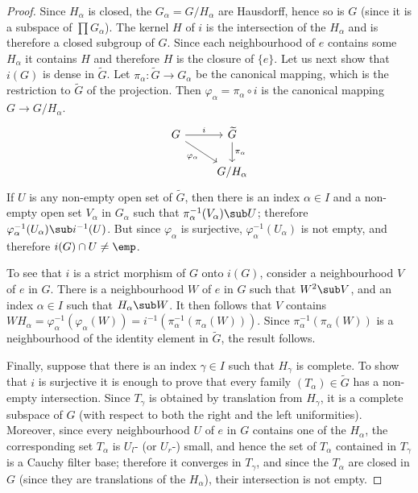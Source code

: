 \begin{proof}
Since $H_\alpha$ is closed, the $G_\alpha=G/H_\alpha$ are Hausdorff, hence so is $G$ (since it is a subspace of $\prod G_\alpha$). The kernel $H$ of $i$ is the intersection of the $H_\alpha$ and is therefore a closed subgroup of $G$. Since each neighbourhood of $e$ contains some $H_\alpha$ it contains $H$ and therefore $H$ is the closure of $\{e\}$. Let us next show that $i(G)$ is dense in $\widetilde{G}$. Let $\pi_\alpha:\widetilde{G}\to G_\alpha$ be the canonical mapping, which is the restriction to $\widetilde{G}$ of the projection. Then $\varphi_\alpha=\pi_\alpha\circ i$ is the canonical mapping $G\to G/H_\alpha$. 
\[\begin{tikzcd}
G\ar[r,"i"]\ar[rd,swap,"\varphi_\alpha"]&\widetilde{G}\ar[d,"\pi_\alpha"]\\
&G/H_\alpha
\end{tikzcd}\]
If $U$ is any non-empty open set of $\widetilde{G}$, then there is an index $\alpha\in I$ and a non-empty open set $V_\alpha$ in $G_\alpha$ such that $\pi_\alpha^{-1}(V_\alpha)\sub U$; therefore $\varphi_\alpha^{-1}(U_\alpha)\sub i^{-1}(U)$. But since $\varphi_\alpha$ is surjective, $\varphi_\alpha^{-1}(U_\alpha)$ is not empty, and therefore $i(G)\cap U\neq\emp$.\par
To see that $i$ is a strict morphism of $G$ onto $i(G)$, consider a neighbourhood $V$ of $e$ in $G$. There is a neighbourhood $W$ of $e$ in $G$ such that $W^2\sub V$, and an index $\alpha\in I$ such that $H_\alpha\sub W$. It then follows that $V$ contains $WH_\alpha=\varphi_\alpha^{-1}(\varphi_\alpha(W))=i^{-1}(\pi_\alpha^{-1}(\pi_\alpha(W)))$. Since $\pi_\alpha^{-1}(\pi_\alpha(W))$ is a neighbourhood of the identity element in $\widetilde{G}$, the result follows.\par
Finally, suppose that there is an index $\gamma\in I$ such that $H_\gamma$ is complete. To show that $i$ is surjective it is enough to prove that every family $(T_\alpha)\in\widetilde{G}$ has a non-empty intersection. Since $T_\gamma$ is obtained by translation from $H_\gamma$, it is a complete subspace of $G$ (with respect to both the right and the left uniformities). Moreover, since every neighbourhood $U$ of $e$ in $G$ contains one of the $H_\alpha$, the corresponding set $T_\alpha$ is $U_l$- (or $U_r$-) small, and hence the set of $T_\alpha$ contained in $T_\gamma$ is a Cauchy filter base; therefore it converges in $T_\gamma$, and since the $T_\alpha$ are closed in $G$ (since they are translations of the $H_\alpha$), their intersection is not empty.
\end{proof}
